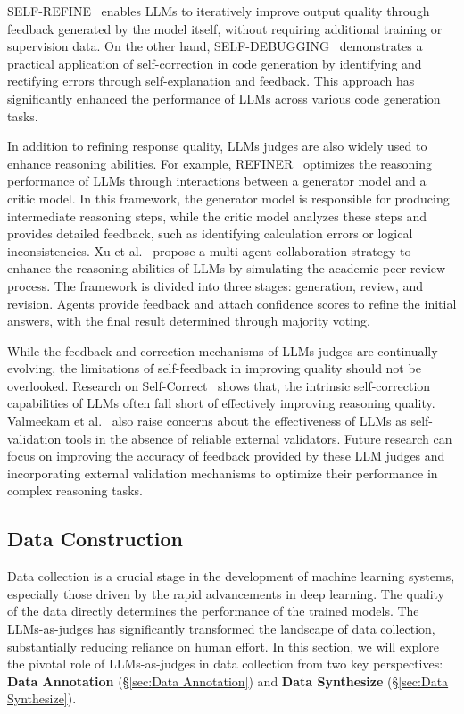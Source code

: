 SELF-REFINE~\cite{madaan2024self} enables LLMs to iteratively improve output quality through feedback generated by the model itself, without requiring additional training or supervision data. On the other hand, SELF-DEBUGGING~\cite{chen2023teaching} demonstrates a practical application of self-correction in code generation by identifying and rectifying errors through self-explanation and feedback. This approach has significantly enhanced the performance of LLMs across various code generation tasks.

In addition to refining response quality, LLMs judges are also widely used to enhance reasoning abilities. For example, REFINER~\cite{paul2023refiner} optimizes the reasoning performance of LLMs through interactions between a generator model and a critic model. In this framework, the generator model is responsible for producing intermediate reasoning steps, while the critic model analyzes these steps and provides detailed feedback, such as identifying calculation errors or logical inconsistencies. Xu et al.~\cite{xu2023towards} propose a multi-agent collaboration strategy to enhance the reasoning abilities of LLMs by simulating the academic peer review process. The framework is divided into three stages: generation, review, and revision. Agents provide feedback and attach confidence scores to refine the initial answers, with the final result determined through majority voting.



While the feedback and correction mechanisms of LLMs judges are continually evolving, the limitations of self-feedback in improving quality should not be overlooked. Research on Self-Correct~\cite{huang2023large,tyen2023llms} shows that, the intrinsic self-correction capabilities of LLMs often fall short of effectively improving reasoning quality. 
Valmeekam et al.~\cite{valmeekam2023can} also raise concerns about the effectiveness of LLMs as self-validation tools in the absence of reliable external validators. Future research can focus on improving the accuracy of feedback provided by these LLM judges and incorporating external validation mechanisms to optimize their performance in complex reasoning tasks.







\subsection{Data Construction}
\label{sec:Data Construction}
Data collection is a crucial stage in the development of machine learning systems, especially those driven by the rapid advancements in deep learning. The quality of the data directly determines the performance of the trained models.
The LLMs-as-judges has significantly transformed the landscape of data collection, substantially reducing reliance on human effort.
In this section, we will explore the pivotal role of LLMs-as-judges in data collection from two key perspectives: \textbf{Data Annotation} (\S\ref{sec:Data Annotation}) and \textbf{Data Synthesize} (\S\ref{sec:Data Synthesize}).


